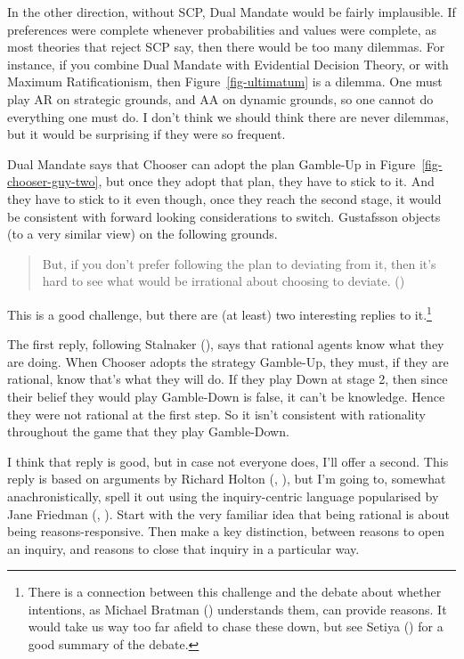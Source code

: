 \documentclass[
  10pt,
  letterpaper,
  DIV=11,
  numbers=noendperiod,
  twoside]{scrartcl}
\begin{document}
In the other direction, without SCP, Dual Mandate would be fairly
implausible. If preferences were complete whenever probabilities and
values were complete, as most theories that reject SCP say, then there
would be too many dilemmas. For instance, if you combine Dual Mandate
with Evidential Decision Theory, or with Maximum Ratificationism, then
Figure~\ref{fig-ultimatum} is a dilemma. One must play AR on strategic
grounds, and AA on dynamic grounds, so one cannot do everything one must
do. I don't think we should think there are never dilemmas, but it would
be surprising if they were so frequent.

Dual Mandate says that Chooser can adopt the plan Gamble-Up in
Figure~\ref{fig-chooser-guy-two}, but once they adopt that plan, they
have to stick to it. And they have to stick to it even though, once they
reach the second stage, it would be consistent with forward looking
considerations to switch. Gustafsson objects (to a very similar view) on
the following grounds.

\begin{quote}
But, if you don't prefer following the plan to deviating from it, then
it's hard to see what would be irrational about choosing to deviate.
()
\end{quote}

This is a good challenge, but there are (at least) two interesting
replies to it.\footnote{There is a connection between this challenge and
  the debate about whether intentions, as Michael Bratman
  () understands them, can provide
  reasons. It would take us way too far afield to chase these down, but
  see Setiya () for a good
  summary of the debate.}

The first reply, following Stalnaker
(), says that rational agents know
what they are doing. When Chooser adopts the strategy Gamble-Up, they
must, if they are rational, know that's what they will do. If they play
Down at stage 2, then since their belief they would play Gamble-Down is
false, it can't be knowledge. Hence they were not rational at the first
step. So it isn't consistent with rationality throughout the game that
they play Gamble-Down.

I think that reply is good, but in case not everyone does, I'll offer a
second. This reply is based on arguments by Richard Holton
(, ), but
I'm going to, somewhat anachronistically, spell it out using the
inquiry-centric language popularised by Jane Friedman
(, ).
Start with the very familiar idea that being rational is about being
reasons-responsive. Then make a key distinction, between reasons to open
an inquiry, and reasons to close that inquiry in a particular way.
\end{document}
